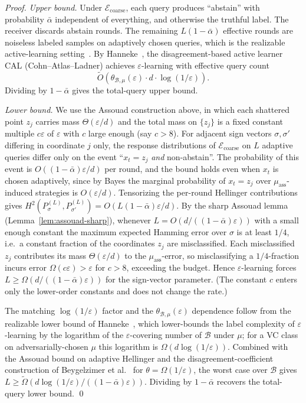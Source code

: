 \documentclass[runningheads,envcountsame]{llncs}
\newcommand{\cB}{\mathcal{B}}
\newcommand{\cE}{\mathcal{E}}
\newcommand{\eps}{\varepsilon}
\newcommand{\dis}{\theta}
\begin{document}
\begin{proof}
\emph{Upper bound.} Under $\cE_{\mathrm{coarse}}$, each query produces ``abstain'' with probability $\bar\alpha$ independent of everything, and otherwise the truthful label. The receiver discards abstain rounds. The remaining $L(1-\bar\alpha)$ effective rounds are noiseless labeled samples on adaptively chosen queries, which is the realizable active-learning setting~\cite{balcan2006agnostic,hanneke2014theory}. By Hanneke~\cite[Theorem 5.1]{hanneke2014theory}, the disagreement-based active learner CAL (Cohn--Atlas--Ladner) achieves $\eps$-learning with effective query count
\[
\tilde O\!\left( \dis_{\cB,\mu}(\eps) \cdot d \cdot \log(1/\eps) \right).
\]
Dividing by $1-\bar\alpha$ gives the total-query upper bound.

\emph{Lower bound.} We use the Assouad construction above, in which each shattered point $z_j$ carries mass $\Theta(\eps/d)$ and the total mass on $\{z_j\}$ is a fixed constant multiple $c\eps$ of $\eps$ with $c$ large enough (say $c > 8$). For adjacent sign vectors $\sigma, \sigma'$ differing in coordinate $j$ only, the response distributions of $\cE_{\mathrm{coarse}}$ on $L$ adaptive queries differ only on the event ``$x_t = z_j$ \emph{and} non-abstain''. The probability of this event is $O((1-\bar\alpha)\eps/d)$ per round, and the bound holds even when $x_t$ is chosen adaptively, since by Bayes the marginal probability of $x_t = z_j$ over $\mu_{\mathrm{ass}}$-induced strategies is $O(\eps/d)$. Tensorizing the per-round Hellinger contributions gives $H^2(P_\sigma^{(L)}, P_{\sigma'}^{(L)}) = O(L(1-\bar\alpha)\eps/d)$. By the sharp Assouad lemma (Lemma~\ref{lem:assouad-sharp}), whenever $L = O(d/((1-\bar\alpha)\eps))$ with a small enough constant the maximum expected Hamming error over $\sigma$ is at least $1/4$, i.e.\ a constant fraction of the coordinates $z_j$ are misclassified. Each misclassified $z_j$ contributes its mass $\Theta(\eps/d)$ to the $\mu_{\mathrm{ass}}$-error, so misclassifying a $1/4$-fraction incurs error $\Omega(c\eps) > \eps$ for $c > 8$, exceeding the budget. Hence $\eps$-learning forces $L \geq \Omega(d/((1-\bar\alpha)\eps))$ for the sign-vector parameter. (The constant $c$ enters only the lower-order constants and does not change the rate.)

The matching $\log(1/\eps)$ factor and the $\dis_{\cB,\mu}(\eps)$ dependence follow from the realizable lower bound of Hanneke~\cite[Theorem 4.1]{hanneke2014theory}, which lower-bounds the label complexity of $\eps$-learning by the logarithm of the $\eps$-covering number of $\cB$ under $\mu$; for a VC class on adversarially-chosen $\mu$ this logarithm is $\Omega(d \log(1/\eps))$. Combined with the Assouad bound on adaptive Hellinger and the disagreement-coefficient construction of Beygelzimer et al.~\cite{beygelzimer2009importance} for $\dis = \Omega(1/\eps)$, the worst case over $\cB$ gives $L \geq \tilde\Omega(d \log(1/\eps) / ((1-\bar\alpha)\eps))$. Dividing by $1-\bar\alpha$ recovers the total-query lower bound. \qed
\end{proof}
\end{document}
